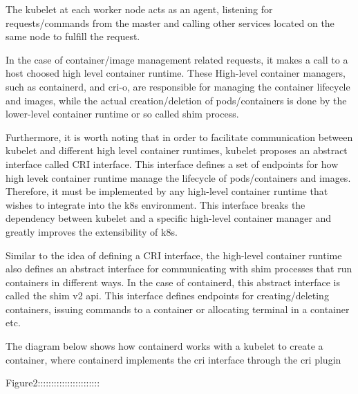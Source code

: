     The kubelet at each worker node acts as an agent, listening for requests/commands from the master and calling other services located on the same node to fulfill the request.
    
    In the case of container/image management related requests, it makes a call to a host choosed high level container runtime.
    These High-level container managers, such as containerd, and cri-o, are responsible for managing the container lifecycle and images, while the actual creation/deletion of pods/containers is done by the lower-level container runtime or so called shim process.

    Furthermore, it is worth noting that in order to facilitate communication between kubelet and different high level container runtimes, kubelet proposes an abstract interface called CRI interface. This interface defines a set 
    of endpoints for how high levek container runtime manage the lifecycle of pods/containers and images. Therefore, it must be implemented by any high-level container runtime that wishes to integrate into the k8s environment. This interface breaks the dependency between kubelet 
    and a specific high-level container manager and greatly improves the extensibility of k8s.
    
    Similar to the idea of defining a CRI interface, the high-level container runtime also defines an abstract interface for communicating with shim processes that run containers in different ways. In the case of containerd, this abstract interface is called the shim v2 api. 
    This interface defines endpoints for creating/deleting containers, issuing commands to a container or allocating terminal in a container etc.




    The diagram below shows how containerd works with a kubelet to create a container, where containerd implements the cri interface through the cri plugin

    Figure2:::::::::::::::::::::::

